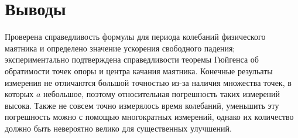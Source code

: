 \documentclass[a4paper,12pt]{article} %
\begin{document}
\section{Выводы}
Проверена справедливость формулы для периода колебаний физического маятника и определено значение ускорения свободного падения; экспериментально подтверждена справедливости теоремы Гюйгенса об обратимости
точек опоры и центра качания маятника. 
Конечные резульаты измерения не отличаются большой точностью из-за наличия множества точек, в которых $a$ небольшое, поэтому относительная погрешность таких измерений высока. Также не совсем точно измерялось время колебаний, уменьшить эту погрешность можно с помощью многократных измерений, однако их количество должно быть невероятно велико для существенных улучшений.
\end{document}
